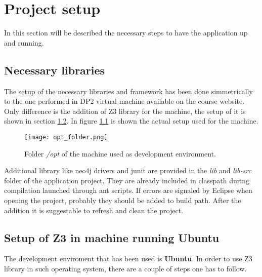 \chapter{Project setup}\label{Chap:Setup}
In this section will be described the necessary steps to have the application up and running.
\section{Necessary libraries}
The setup of the necessary libraries and framework has been done simmetrically to the one performed in DP2 virtual machine available on the course website. Only difference is the addition of Z3 library for the machine, the setup of it is shown in section \ref{SubSec:Z3Setup}. In figure \ref{Fig:OptFolder} is shown the actual setup used for the machine.
\begin{figure}[!htb]
   \centering
   \texttt{[image: opt\_folder.png]}
   \caption{Folder \textit{/opt} of the machine used as development environment.}\label{Fig:OptFolder}
\end{figure}
Additional library like neo4j drivers and junit are provided in the \textit{lib} and \textit{lib-src} folder of the application project. They are already included in classpath during compilation launched through ant scripts. If errors are signaled by Eclipse when opening the project, probably they should be added to build path. After the addition it is suggestable to refresh and clean the project.



\section{Setup of Z3 in machine running Ubuntu}\label{SubSec:Z3Setup}
The development enviroment that has been used is \textbf{Ubuntu}. In order to use Z3 library in such operating system, there are a couple of steps one has to follow.

